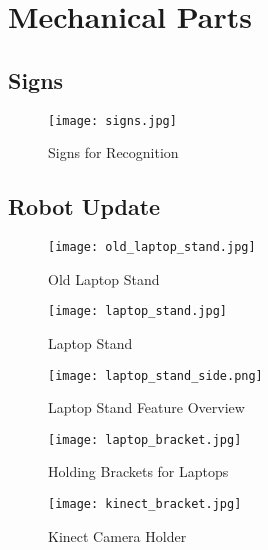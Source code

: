 \chapter{Mechanical Parts}
\graphicspath{{./Mechanical/img/}}



\section{Signs}
 \begin{figure}[htp]
\begin{center}
  \texttt{[image: signs.jpg]}
  \caption{Signs for Recognition}
  \label{figure:signs}
\end{center}
\end{figure}

\section{Robot Update}

\begin{figure}[htp]
\begin{center}
  \texttt{[image: old\_laptop\_stand.jpg]}
  \caption{Old Laptop Stand}
  \label{figure:old_stand}
\end{center}
\end{figure}
\begin{figure}[htp]
\begin{center}
  \texttt{[image: laptop\_stand.jpg]}
  \caption{Laptop Stand}
  \label{figure:laptop_stand}
\end{center}
\end{figure}
\begin{figure}[htp]
\begin{center}
  \texttt{[image: laptop\_stand\_side.png]}
  \caption{Laptop Stand Feature Overview}
  \label{figure:laptop_stand_side}
\end{center}
\end{figure}


\begin{figure}[htp]
\begin{center}
  \texttt{[image: laptop\_bracket.jpg]}
  \caption{Holding Brackets for Laptops}
  \label{figure:laptop_bracket}
\end{center}
\end{figure}
\begin{figure}[htp]
\begin{center}
  \texttt{[image: kinect\_bracket.jpg]}
  \caption{Kinect Camera Holder}
  \label{figure:kc_hold}
\end{center}
\end{figure}


